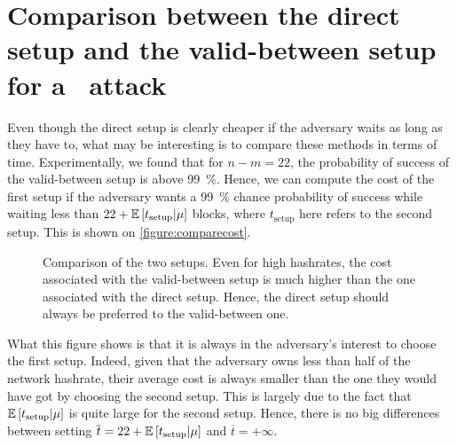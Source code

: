 \section{Comparison between the direct setup and the valid-between setup for a \cs\ attack}
\label{section:comparesetups}

Even though the direct setup is clearly cheaper if the adversary waits as long as they have to, what may be interesting is to compare these methods in terms of time. Experimentally, we found that for \(n - m = 22\), the probability of success of the valid-between setup is above \SI{99}{\percent}. Hence, we can compute the cost of the first setup if the adversary wants a \SI{99}{\percent} chance probability of success while waiting less than \(22+\mathbb{E}\left[t_{\text{setup}}\middle|\mu\right]\) blocks, where \(t_{\text{setup}}\) here refers to the second setup. This is shown on \autoref{figure:comparecost}.

\begin{figure}[ht]
    \centering
    \caption{Comparison of the two setups. Even for high hashrates, the cost associated with the valid-between setup is much higher than the one associated with the direct setup. Hence, the direct setup should always be preferred to the valid-between one.}
    \label{figure:comparecost}
\end{figure}

What this figure shows is that it is always in the adversary's interest to choose the first setup. Indeed, given that the adversary owns less than half of the network hashrate, their average cost is always smaller than the one they would have got by choosing the second setup. This is largely due to the fact that \(\mathbb{E}\left[t_{\text{setup}}\middle|\mu\right]\) is quite large for the second setup. Hence, there is no big differences between setting \(\overline{t}=22+\mathbb{E}\left[t_{\text{setup}}\middle|\mu\right]\) and \(\overline{t}=+\infty\).

